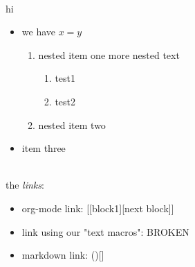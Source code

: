 \documentclass[11pt]{article}
\begin{document}
\\
hi
\\
\begin{itemize}
\item  \fbox{\phantom{X}} we have \(x=y\)
\begin{enumerate}
\renewcommand{\labelenumii}{\alph{enumii.}}
  \item  \fbox{\phantom{X}} nested item one
     more nested text
\begin{enumerate}
\renewcommand{\labelenumiii}{\arabic{enumiii.}}
     \item  \fbox{\phantom{X}} test1
     \item  {} test2
\end{enumerate}

  \item  \fbox{-} nested item two
\end{enumerate}
\item  {} item three
\end{itemize}

\\
the \textit{links}:
\\
\begin{itemize}
\item  org-mode link:                [[block1][next block]]
\item  link using our "text macros": BROKEN\item  markdown link:                ()[]
\end{itemize}
\end{document}
